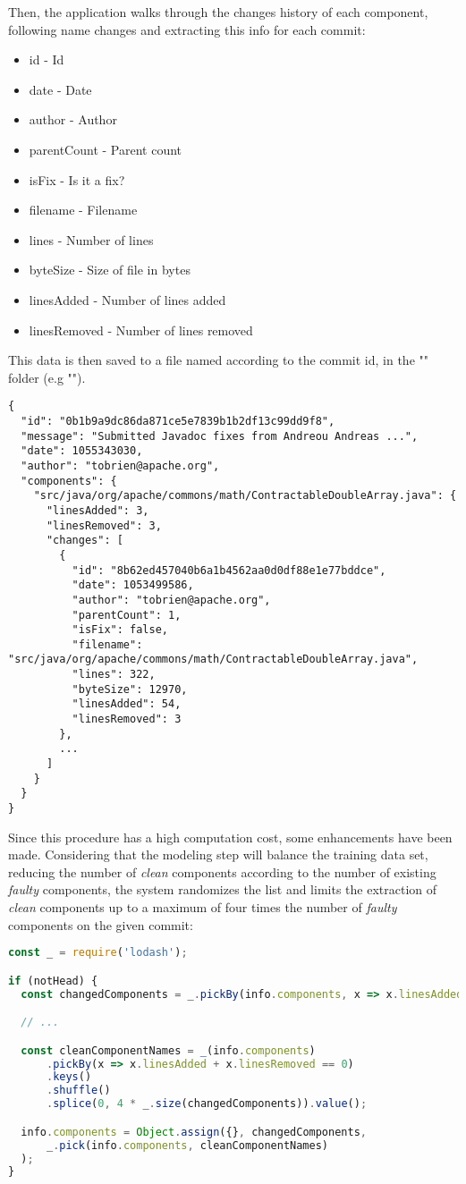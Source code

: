 Then, the application walks through the changes history of each component, following name changes and extracting this info for each commit:
%
\begin{itemize}
\item id - Id
\item date - Date
\item author - Author
\item parentCount - Parent count
\item isFix - Is it a fix?
\item filename - Filename
\item lines - Number of lines
\item byteSize - Size of file in bytes
\item linesAdded - Number of lines added
\item linesRemoved - Number of lines removed
\end{itemize}

This data is then saved to a file named according to the commit id, in the "" folder (e.g "").

\begin{lstlisting}
{
  "id": "0b1b9a9dc86da871ce5e7839b1b2df13c99dd9f8",
  "message": "Submitted Javadoc fixes from Andreou Andreas ...",
  "date": 1055343030,
  "author": "tobrien@apache.org",
  "components": {
    "src/java/org/apache/commons/math/ContractableDoubleArray.java": {
      "linesAdded": 3,
      "linesRemoved": 3,
      "changes": [
        {
          "id": "8b62ed457040b6a1b4562aa0d0df88e1e77bddce",
          "date": 1053499586,
          "author": "tobrien@apache.org",
          "parentCount": 1,
          "isFix": false,
          "filename": "src/java/org/apache/commons/math/ContractableDoubleArray.java",
          "lines": 322,
          "byteSize": 12970,
          "linesAdded": 54,
          "linesRemoved": 3
        },
        ...
      ]
    }
  }
}
\end{lstlisting}

Since this procedure has a high computation cost, some enhancements have been made. Considering that the modeling step will balance the training data set,
reducing the number of \emph{clean} components according to the number of existing \emph{faulty} components, the system randomizes the list and
limits the extraction of \emph{clean} components up to a maximum of four times the number of \emph{faulty} components on the given commit:
%
\begin{lstlisting}[language=Javascript]
const _ = require('lodash');

if (notHead) {
  const changedComponents = _.pickBy(info.components, x => x.linesAdded + x.linesRemoved > 0);

  // ...

  const cleanComponentNames = _(info.components)
      .pickBy(x => x.linesAdded + x.linesRemoved == 0)
      .keys()
      .shuffle()
      .splice(0, 4 * _.size(changedComponents)).value();

  info.components = Object.assign({}, changedComponents,
      _.pick(info.components, cleanComponentNames)
  );
}
\end{lstlisting}

